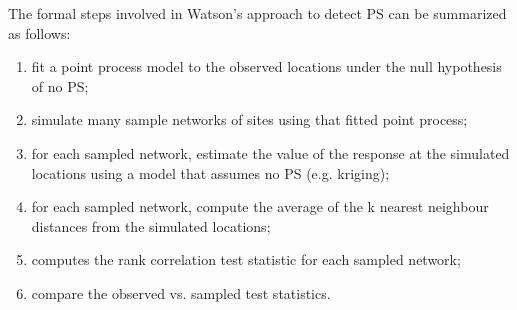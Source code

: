 

The formal steps involved in  Watson's approach \cite{watson2020} to detect \ac{PS} can be summarized as follows:
\begin{enumerate}
\item fit a point process model to the observed locations under the null hypothesis of no \ac{PS};
\item simulate many sample networks of sites using that fitted point process;
\item for each sampled network, estimate the value of the response at the simulated locations using a model that assumes no PS (e.g. kriging); 
\item for each sampled network, compute the average of the \gls{k} nearest neighbour distances from the simulated locations; 
\item computes the rank correlation test statistic for each sampled network;
\item compare the observed vs. sampled test statistics.
\end{enumerate}





